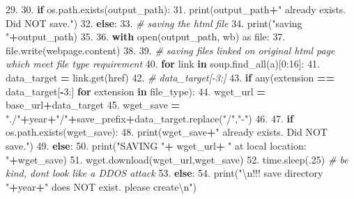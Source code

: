 \documentclass[
]{book}
\newenvironment{Shaded}{\begin{snugshade}}{\end{snugshade}}
\newcommand{\BuiltInTok}[1]{#1}
\newcommand{\CharTok}[1]{\textcolor[rgb]{0.31,0.60,0.02}{#1}}
\newcommand{\CommentTok}[1]{\textcolor[rgb]{0.56,0.35,0.01}{\textit{#1}}}
\newcommand{\ControlFlowTok}[1]{\textcolor[rgb]{0.13,0.29,0.53}{\textbf{#1}}}
\newcommand{\DecValTok}[1]{\textcolor[rgb]{0.00,0.00,0.81}{#1}}
\newcommand{\FloatTok}[1]{\textcolor[rgb]{0.00,0.00,0.81}{#1}}
\newcommand{\ImportTok}[1]{#1}
\newcommand{\KeywordTok}[1]{\textcolor[rgb]{0.13,0.29,0.53}{\textbf{#1}}}
\newcommand{\NormalTok}[1]{#1}
\newcommand{\OperatorTok}[1]{\textcolor[rgb]{0.81,0.36,0.00}{\textbf{#1}}}
\newcommand{\StringTok}[1]{\textcolor[rgb]{0.31,0.60,0.02}{#1}}
\begin{document}
\begin{Shaded}
\begin{Highlighting}[]
\FloatTok{29.}     
\FloatTok{30.}         \ControlFlowTok{if}\NormalTok{ os.path.exists(output\_path):}
\FloatTok{31.}             \BuiltInTok{print}\NormalTok{(output\_path}\OperatorTok{+}\StringTok{" already exists. Did NOT save."}\NormalTok{)}
\FloatTok{32.}         \ControlFlowTok{else}\NormalTok{:}
\FloatTok{33.}             \CommentTok{\# saving the html file}
\FloatTok{34.}             \BuiltInTok{print}\NormalTok{(}\StringTok{"saving "}\OperatorTok{+}\NormalTok{output\_path)}
\FloatTok{35.}     
\FloatTok{36.}             \ControlFlowTok{with} \BuiltInTok{open}\NormalTok{(output\_path, }\StringTok{\textquotesingle{}wb\textquotesingle{}}\NormalTok{) }\ImportTok{as} \BuiltInTok{file}\NormalTok{:}
\FloatTok{37.}                 \BuiltInTok{file}\NormalTok{.write(webpage.content) }
\FloatTok{38.}             
\FloatTok{39.}         \CommentTok{\# saving files linked on original html page which meet file type requirement}
\FloatTok{40.}         \ControlFlowTok{for}\NormalTok{ link }\KeywordTok{in}\NormalTok{ soup.find\_all(}\StringTok{\textquotesingle{}a\textquotesingle{}}\NormalTok{)[}\DecValTok{0}\NormalTok{:}\DecValTok{16}\NormalTok{]:  }
\FloatTok{41.}\NormalTok{             data\_target }\OperatorTok{=}\NormalTok{ link.get(}\StringTok{\textquotesingle{}href\textquotesingle{}}\NormalTok{)}
\FloatTok{42.}             \CommentTok{\# data\_target[{-}3:]}
\FloatTok{43.}             \ControlFlowTok{if} \BuiltInTok{any}\NormalTok{(extension }\OperatorTok{==}\NormalTok{ data\_target[}\OperatorTok{{-}}\DecValTok{3}\NormalTok{:] }\ControlFlowTok{for}\NormalTok{ extension }\KeywordTok{in}\NormalTok{ file\_type):}
\FloatTok{44.}\NormalTok{                 wget\_url }\OperatorTok{=}\NormalTok{ base\_url}\OperatorTok{+}\NormalTok{data\_target}
\FloatTok{45.}\NormalTok{                 wget\_save }\OperatorTok{=} \StringTok{"./"}\OperatorTok{+}\NormalTok{year}\OperatorTok{+}\StringTok{"/"}\OperatorTok{+}\NormalTok{save\_prefix}\OperatorTok{+}\NormalTok{data\_target.replace(}\StringTok{"/"}\NormalTok{,}\StringTok{"{-}"}\NormalTok{)}
\FloatTok{46.}     
\FloatTok{47.}                 \ControlFlowTok{if}\NormalTok{ os.path.exists(wget\_save):}
\FloatTok{48.}                     \BuiltInTok{print}\NormalTok{(wget\_save}\OperatorTok{+}\StringTok{" already exists. Did NOT save."}\NormalTok{)}
\FloatTok{49.}                 \ControlFlowTok{else}\NormalTok{:}
\FloatTok{50.}                     \BuiltInTok{print}\NormalTok{(}\StringTok{"SAVING "}\OperatorTok{+}\NormalTok{ wget\_url}\OperatorTok{+} \StringTok{" at local location: "}\OperatorTok{+}\NormalTok{wget\_save)}
\FloatTok{51.}\NormalTok{                     wget.download(wget\_url,wget\_save)}
\FloatTok{52.}\NormalTok{                     time.sleep(}\FloatTok{.25}\NormalTok{) }\CommentTok{\# be kind, don\textquotesingle{}t look like a DDOS attack}
\FloatTok{53.}     \ControlFlowTok{else}\NormalTok{:}
\FloatTok{54.}         \BuiltInTok{print}\NormalTok{(}\StringTok{"}\CharTok{\textbackslash{}n}\StringTok{!!! save directory "}\OperatorTok{+}\NormalTok{year}\OperatorTok{+}\StringTok{" does NOT exist. please create}\CharTok{\textbackslash{}n}\StringTok{"}\NormalTok{)}
\end{Highlighting}
\end{Shaded}
\end{document}
